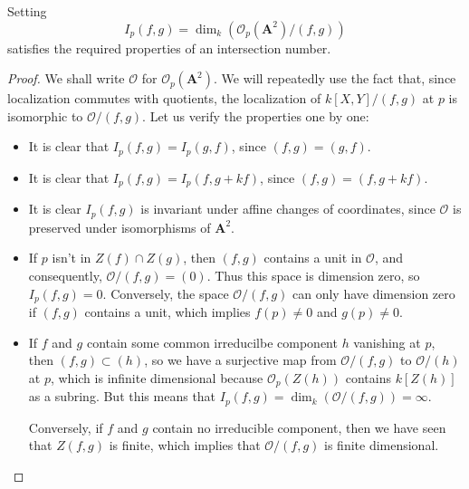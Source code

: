 \begin{theorem}
    Setting
    \[ I_p(f,g) = \dim_k \left( \mathcal{O}_p(\mathbf{A}^2)/(f,g) \right) \]
    satisfies the required properties of an intersection number.
\end{theorem}
\begin{proof}
    We shall write $\mathcal{O}$ for $\mathcal{O}_p(\mathbf{A}^2)$. We will repeatedly use the fact that, since localization commutes with quotients, the localization of $k[X,Y]/(f,g)$ at $p$ is isomorphic to $\mathcal{O}/(f,g)$. Let us verify the properties one by one:
    \begin{itemize}
        \item It is clear that $I_p(f,g) = I_p(g,f)$, since $(f,g) = (g,f)$.
        \item It is clear that $I_p(f,g) = I_p(f,g+kf)$, since $(f,g) = (f,g + kf)$.
        \item It is clear $I_p(f,g)$ is invariant under affine changes of coordinates, since $\mathcal{O}$ is preserved under isomorphisms of $\mathbf{A}^2$.

        \item If $p$ isn't in $Z(f) \cap Z(g)$, then $(f,g)$ contains a unit in $\mathcal{O}$, and consequently, $\mathcal{O}/(f,g) = (0)$. Thus this space is dimension zero, so $I_p(f,g) = 0$. Conversely, the space $\mathcal{O}/(f,g)$ can only have dimension zero if $(f,g)$ contains a unit, which implies $f(p) \neq 0$ and $g(p) \neq 0$.

        \item If $f$ and $g$ contain some common irreducilbe component $h$ vanishing at $p$, then $(f,g) \subset (h)$, so we have a surjective map from $\mathcal{O}/(f,g)$ to $\mathcal{O}/(h)$ at $p$, which is infinite dimensional because $\mathcal{O}_p(Z(h))$ contains $k[Z(h)]$ as a subring. But this means that $I_p(f,g) = \dim_k(\mathcal{O}/(f,g)) = \infty$.

        Conversely, if $f$ and $g$ contain no irreducible component, then we have seen that $Z(f,g)$ is finite, which implies that $\mathcal{O}/(f,g)$ is finite dimensional.


\end{itemize}
\end{proof}

